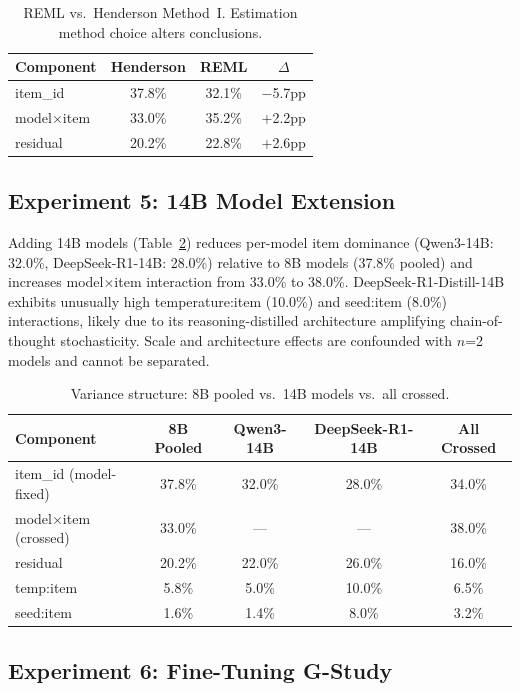 \documentclass[11pt]{article}
\begin{document}
\begin{table}[t]
\centering
\caption{REML vs.\ Henderson Method~I. Estimation method choice alters conclusions.}
\label{tab:reml}
\begin{tabular}{lccc}
\toprule
Component & Henderson & REML & $\Delta$ \\
\midrule
item\_id          & 37.8\% & 32.1\% & $-$5.7pp \\
model$\times$item & 33.0\% & 35.2\% & +2.2pp \\
residual          & 20.2\% & 22.8\% & +2.6pp \\
\bottomrule
\end{tabular}
\end{table}

\subsection{Experiment 5: 14B Model Extension}
\label{sec:exp5}

Adding 14B models (Table~\ref{tab:14b}) reduces per-model item dominance (Qwen3-14B: 32.0\%, DeepSeek-R1-14B: 28.0\%) relative to 8B models (37.8\% pooled) and increases model$\times$item interaction from 33.0\% to 38.0\%.
DeepSeek-R1-Distill-14B exhibits unusually high temperature:item (10.0\%) and seed:item (8.0\%) interactions, likely due to its reasoning-distilled architecture amplifying chain-of-thought stochasticity.
Scale and architecture effects are confounded with $n$=2 models and cannot be separated.

\begin{table}[t]
\centering
\caption{Variance structure: 8B pooled vs.\ 14B models vs.\ all crossed.}
\label{tab:14b}
\begin{tabular}{lcccc}
\toprule
Component & 8B Pooled & Qwen3-14B & DeepSeek-R1-14B & All Crossed \\
\midrule
item\_id (model-fixed) & 37.8\% & 32.0\% & 28.0\% & 34.0\% \\
model$\times$item (crossed) & 33.0\% & --- & --- & 38.0\% \\
residual                & 20.2\% & 22.0\% & 26.0\% & 16.0\% \\
temp:item               & 5.8\%  & 5.0\%  & 10.0\% & 6.5\%  \\
seed:item               & 1.6\%  & 1.4\%  & 8.0\%  & 3.2\%  \\
\bottomrule
\end{tabular}
\end{table}

\subsection{Experiment 6: Fine-Tuning G-Study}
\label{sec:exp6}
\end{document}
